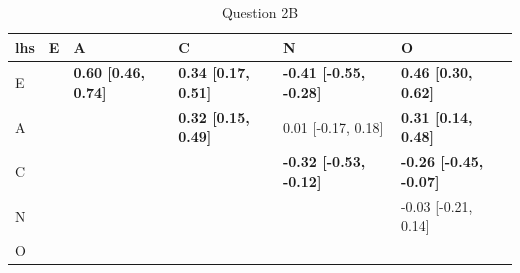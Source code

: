 \documentclass{article}\usepackage[]{graphicx}\usepackage[]{color}
\newenvironment{knitrout}{}{} %
\begin{document}
\begin{knitrout}
\begin{table}
\caption{\label{tab:unnamed-chunk-8}Question 2B}
\centering
\begin{tabular}[t]{llllll}
\toprule
lhs & E & A & C & N & O\\
\midrule
E &  & \textbf{0.60 [0.46, 0.74]} & \textbf{0.34 [0.17, 0.51]} & \textbf{-0.41 [-0.55, -0.28]} & \textbf{0.46 [0.30, 0.62]}\\
A &  &  & \textbf{0.32 [0.15, 0.49]} & 0.01 [-0.17, 0.18] & \textbf{0.31 [0.14, 0.48]}\\
C &  &  &  & \textbf{-0.32 [-0.53, -0.12]} & \textbf{-0.26 [-0.45, -0.07]}\\
N &  &  &  &  & -0.03 [-0.21, 0.14]\\
O &  &  &  &  & \\
\bottomrule
\end{tabular}
\end{table}


\end{knitrout}
\end{document}
